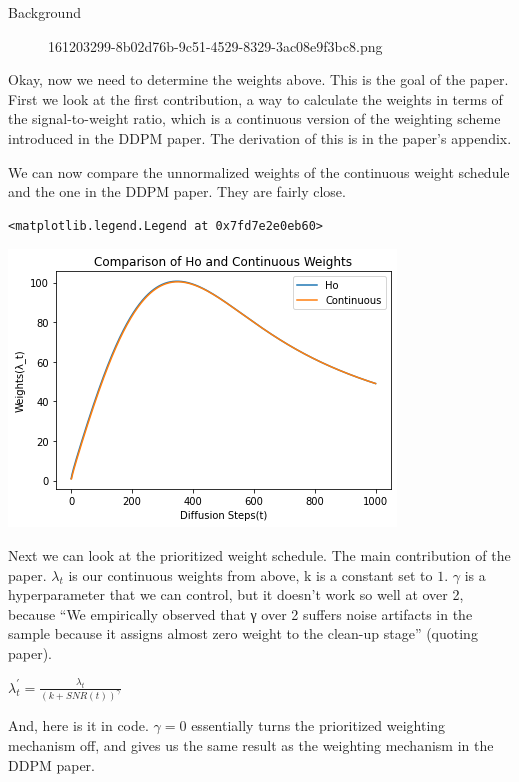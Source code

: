 \documentclass[
  ignorenonframetext,
]{beamer}
\begin{document}
\begin{frame}[fragile]{Background}
\begin{figure}
{}

\caption{161203299-8b02d76b-9c51-4529-8329-3ac08e9f3bc8.png}

\end{figure}

Okay, now we need to determine the weights above. This is the goal of
the paper. First we look at the first contribution, a way to calculate
the weights in terms of the signal-to-weight ratio, which is a
continuous version of the weighting scheme introduced in the DDPM paper.
The derivation of this is in the paper's appendix.

We can now compare the unnormalized weights of the continuous weight
schedule and the one in the DDPM paper. They are fairly close.

\begin{verbatim}
<matplotlib.legend.Legend at 0x7fd7e2e0eb60>
\end{verbatim}

\includegraphics{Perception Prioritized Training of Diffusion Models_files/figure-beamer/cell-10-output-2.png}

Next we can look at the prioritized weight schedule. The main
contribution of the paper. \(\lambda_t\) is our continuous weights from
above, k is a constant set to \(1\). \(\gamma\) is a hyperparameter that
we can control, but it doesn't work so well at over 2, because ``We
empirically observed that γ over 2 suffers noise artifacts in the sample
because it assigns almost zero weight to the clean-up stage'' (quoting
paper).

\(\lambda_t^\prime = \frac{\lambda_t}{(k+SNR(t))^\gamma}\)

And, here is it in code. \(\gamma=0\) essentially turns the prioritized
weighting mechanism off, and gives us the same result as the weighting
mechanism in the DDPM paper.


\end{frame}
\end{document}
